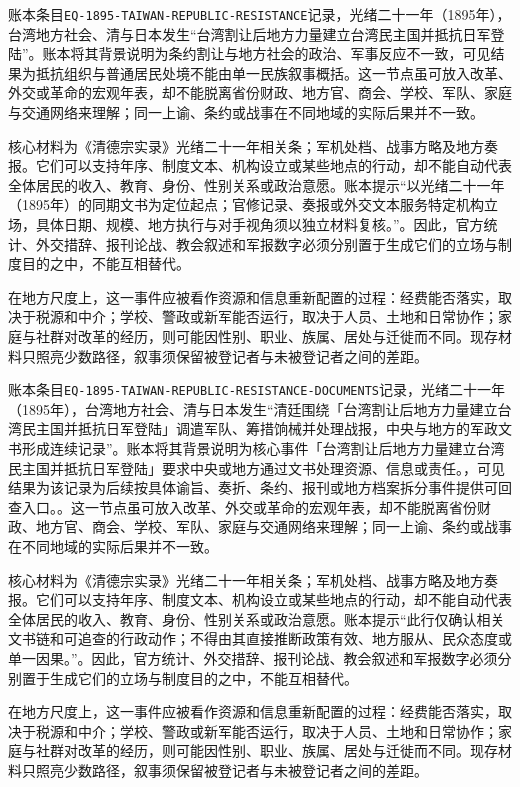 账本条目\texttt{EQ-1895-TAIWAN-REPUBLIC-RESISTANCE}记录，光绪二十一年（1895年），台湾地方社会、清与日本发生“台湾割让后地方力量建立台湾民主国并抵抗日军登陆”。账本将其背景说明为条约割让与地方社会的政治、军事反应不一致，可见结果为抵抗组织与普通居民处境不能由单一民族叙事概括。这一节点虽可放入改革、外交或革命的宏观年表，却不能脱离省份财政、地方官、商会、学校、军队、家庭与交通网络来理解；同一上谕、条约或战事在不同地域的实际后果并不一致。

核心材料为《清德宗实录》光绪二十一年相关条；军机处档、战事方略及地方奏报。它们可以支持年序、制度文本、机构设立或某些地点的行动，却不能自动代表全体居民的收入、教育、身份、性别关系或政治意愿。账本提示“以光绪二十一年（1895年）的同期文书为定位起点；官修记录、奏报或外交文本服务特定机构立场，具体日期、规模、地方执行与对手视角须以独立材料复核。”。因此，官方统计、外交措辞、报刊论战、教会叙述和军报数字必须分别置于生成它们的立场与制度目的之中，不能互相替代。

在地方尺度上，这一事件应被看作资源和信息重新配置的过程：经费能否落实，取决于税源和中介；学校、警政或新军能否运行，取决于人员、土地和日常协作；家庭与社群对改革的经历，则可能因性别、职业、族属、居处与迁徙而不同。现存材料只照亮少数路径，叙事须保留被登记者与未被登记者之间的差距。

账本条目\texttt{EQ-1895-TAIWAN-REPUBLIC-RESISTANCE-DOCUMENTS}记录，光绪二十一年（1895年），台湾地方社会、清与日本发生“清廷围绕「台湾割让后地方力量建立台湾民主国并抵抗日军登陆」调遣军队、筹措饷械并处理战报，中央与地方的军政文书形成连续记录”。账本将其背景说明为核心事件「台湾割让后地方力量建立台湾民主国并抵抗日军登陆」要求中央或地方通过文书处理资源、信息或责任。，可见结果为该记录为后续按具体谕旨、奏折、条约、报刊或地方档案拆分事件提供可回查入口。。这一节点虽可放入改革、外交或革命的宏观年表，却不能脱离省份财政、地方官、商会、学校、军队、家庭与交通网络来理解；同一上谕、条约或战事在不同地域的实际后果并不一致。

核心材料为《清德宗实录》光绪二十一年相关条；军机处档、战事方略及地方奏报。它们可以支持年序、制度文本、机构设立或某些地点的行动，却不能自动代表全体居民的收入、教育、身份、性别关系或政治意愿。账本提示“此行仅确认相关文书链和可追查的行政动作；不得由其直接推断政策有效、地方服从、民众态度或单一因果。”。因此，官方统计、外交措辞、报刊论战、教会叙述和军报数字必须分别置于生成它们的立场与制度目的之中，不能互相替代。

在地方尺度上，这一事件应被看作资源和信息重新配置的过程：经费能否落实，取决于税源和中介；学校、警政或新军能否运行，取决于人员、土地和日常协作；家庭与社群对改革的经历，则可能因性别、职业、族属、居处与迁徙而不同。现存材料只照亮少数路径，叙事须保留被登记者与未被登记者之间的差距。

